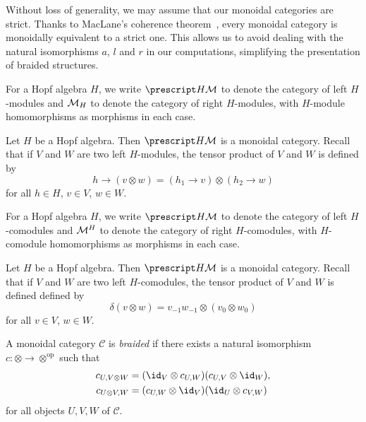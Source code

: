 Without loss of generality, we may assume that our monoidal categories are strict. Thanks to 
MacLane's coherence theorem~\cite[Theorem XI.5.3]{zbMATH00706259}, every monoidal category is monoidally equivalent to a strict one. This allows us to avoid dealing with the natural isomorphisms $a$, $l$ and $r$ in our computations, simplifying the presentation of braided structures.

For a Hopf algebra $H$, 
we write $\lmod{H}$ to denote the category of 
left $H$-modules and $\mathcal{M}_{H}$ 
to denote the category of right $H$-modules, with $H$-module 
homomorphisms as morphisms in each case.

\begin{example}
Let $H$ be a Hopf algebra. Then $\lmod{H}$ is a monoidal
category.  Recall that if $V$ and $W$ are two left $H$-modules, the tensor
product of $V$ and $W$ is defined by 
\[
h\rightarrow(v\otimes w)=(h_{1}\rightarrow v)\otimes(h_{2}\rightarrow w)
\]
for all $h\in H$, $v\in V$, $w\in W$. 
\end{example}

For a Hopf algebra $H$, 
we write $\lcomod{H}$ to denote the category of 
left $H$-comodules and $\mathcal{M}^{H}$ 
to denote the category of right $H$-comodules, with $H$-comodule 
homomorphisms as morphisms in each case.

\begin{example}
Let $H$ be a Hopf algebra. Then $\lcomod{H}$ is a monoidal
category.  Recall that if $V$ and $W$ are two left $H$-comodules, the tensor
product of $V$ and $W$ is defined defined by 
\[
\delta(v\otimes w)=v_{-1}w_{-1}\otimes(v_0\otimes w_0)
\]
for all $v\in V$, $w\in W$.
\end{example}


\begin{definition}
A monoidal category $\mathcal{C}$ is \emph{braided} if there
exists a natural isomorphism $c:\otimes\to\otimes^{\mathrm{op}}$
such that
\begin{align}
c_{U,V\otimes W} & =(\id_{V}\otimes c_{U,W})(c_{U,V}\otimes\id_{W}),\label{eq:braided1}\\
c_{U\otimes V,W} & =(c_{U,W}\otimes\id_{V})(\id_{U}\otimes c_{V,W})\label{eq:braided2}
\end{align}
for all objects $U,V,W$ of $\mathcal{C}$. 
\end{definition}


